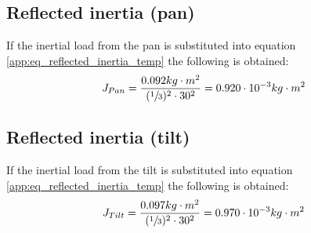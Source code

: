 \subsection{Reflected inertia (pan)}
If the inertial load from the pan is substituted into equation \ref{app:eq_reflected_inertia_temp} the following is obtained:
\begin{equation}
	J_{Pan} = \frac{0.092 kg \cdot m^{2}}{(\sfrac{1}{3})^{2} \cdot 30^{2}} = 0.920 \cdot 10^{-3} kg \cdot m^{2} \label{app:eq_reflected_pan_inertia}
\end{equation}

\subsection{Reflected inertia (tilt)}
If the inertial load from the tilt is substituted into equation \ref{app:eq_reflected_inertia_temp} the following is obtained:
\begin{equation}
	J_{Tilt} = \frac{0.097 kg \cdot m^{2}}{(\sfrac{1}{3})^{2} \cdot 30^{2}} = 0.970 \cdot 10^{-3} kg \cdot m^{2} \label{app:eq_reflected_tilt_inertia}
\end{equation} 

